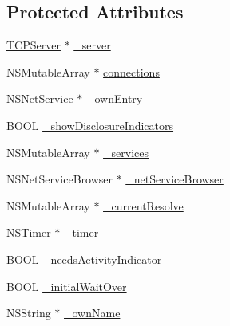 \subsection*{Protected Attributes}
\begin{DoxyCompactItemize}
\item 
\hyperlink{interface_t_c_p_server}{TCPServer} $\ast$ \hyperlink{interface_synchronizer_aacb0d561b81284ff5f32bb7f504d844c}{\_\-server}
\item 
NSMutableArray $\ast$ \hyperlink{interface_synchronizer_ab614350bf23f5280a2b4bb8df11e893b}{connections}
\item 
NSNetService $\ast$ \hyperlink{interface_synchronizer_acf8e0a71e3a15b64d141cf0387f6a560}{\_\-ownEntry}
\item 
BOOL \hyperlink{interface_synchronizer_a2336bd720576551dba8f8d780a7a2532}{\_\-showDisclosureIndicators}
\item 
NSMutableArray $\ast$ \hyperlink{interface_synchronizer_a2a30fdc9d63f496a755a2c70917319e6}{\_\-services}
\item 
NSNetServiceBrowser $\ast$ \hyperlink{interface_synchronizer_ac311277b3e40c4b5f5027c113b7766e2}{\_\-netServiceBrowser}
\item 
NSMutableArray $\ast$ \hyperlink{interface_synchronizer_a2f2ea2a6ef20f7f7280c1b9bda08469c}{\_\-currentResolve}
\item 
NSTimer $\ast$ \hyperlink{interface_synchronizer_a7c4b3e8add18b09f83d6a5432c7eb9ad}{\_\-timer}
\item 
BOOL \hyperlink{interface_synchronizer_a7580f99fb2c5b18079cb7d0f13b53c37}{\_\-needsActivityIndicator}
\item 
BOOL \hyperlink{interface_synchronizer_a576e79a0c313848fb85b32bb52a05cc2}{\_\-initialWaitOver}
\item 
NSString $\ast$ \hyperlink{interface_synchronizer_ad9ec4e9aff66fd4f5d0ce3236d85f0e3}{\_\-ownName}
\end{DoxyCompactItemize}
